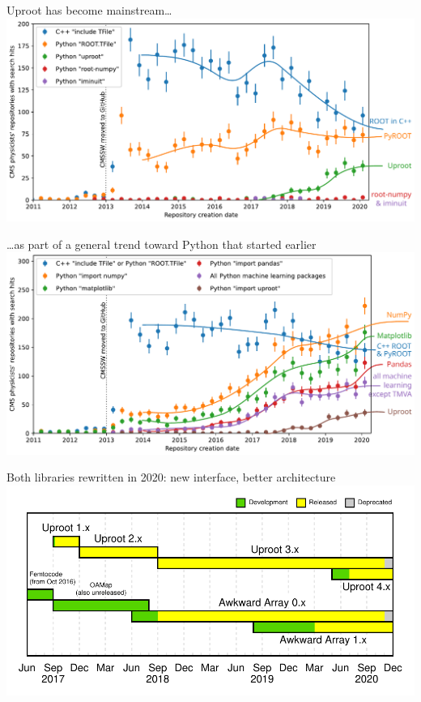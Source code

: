 \documentclass[aspectratio=169]{beamer}
\begin{document}
\begin{frame}{Uproot has become mainstream\ldots}
\vspace{0.75 cm}
\includegraphics[width=\linewidth]{03-github-root-python.pdf}
\end{frame}

\begin{frame}{\ldots as part of a general trend toward Python that started earlier}
\vspace{0.75 cm}
\includegraphics[width=\linewidth]{05-github-anyroot-python-machinelearning-uproot.pdf}
\end{frame}

\begin{frame}{Both libraries rewritten in 2020: new interface, better architecture}
\vspace{0.5 cm}
\includegraphics[width=\linewidth]{uproot-awkward-timeline.pdf}
\end{frame}
\end{document}
